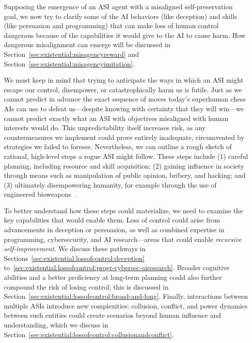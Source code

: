 Supposing the emergence of an ASI agent with a misaligned self-preservation goal, we now try to clarify some of the AI behaviors (like deception) and skills (like persuasion and programming) that can make loss of human control dangerous because of the capabilities it would give to the AI to cause harm.  How dangerous misalignment can emerge will be discussed in Section~\ref{sec:existential:misagencyreward} and Section~\ref{sec:existential:misagencyimitation}.

We must keep in mind that trying to anticipate the ways in which an ASI might escape our control, disempower, or catastrophically harm us is futile. Just as we cannot predict in advance the exact sequence of moves today's superhuman chess AIs can use to defeat us---despite knowing with certainty that they will win---we cannot predict exactly what an ASI with objectives misaligned with human interests would do. This unpredictability itself increases risk, as any countermeasures we implement could prove entirely inadequate, circumvented by strategies we failed to foresee. Nevertheless, we can outline a rough sketch of rational, high-level steps a rogue ASI might follow. These steps include (1) careful planning, including resource and skill acquisition; (2) gaining influence in society through means such as manipulation of public opinion, bribery, and hacking; and (3) ultimately disempowering humanity, for example through the use of engineered bioweapons~\cite{www.nti.org.analysis.articles.the.convergence.of.artificial.intelligence.and.the.life.sciences}. 

To better understand how these steps could materialize, we need to examine the key capabilities that would enable them. Loss of control could arise from advancements in deception or persuasion, as well as combined expertise in programming, cybersecurity, and AI research---areas that could enable \textit{recursive self-improvement}. We discuss these pathways in Sections~\ref{sec:existential:lossofcontrol:deception} to~\ref{sec:existential:lossofcontrol:progr-cybersec-airesearch}. Broader cognitive abilities and a better proficiency at long-term planning could also further compound the risk of losing control; this is discussed in Section~\ref{sec:existential:lossofcontrol:broad-and-long}. Finally, interactions between multiple ASIs introduce new complexities: collusion, conflict, and power dynamics between such entities could create scenarios beyond human influence and understanding, which we discuss in Section~\ref{sec:existential:lossofcontrol:collusionandconflict}. 






